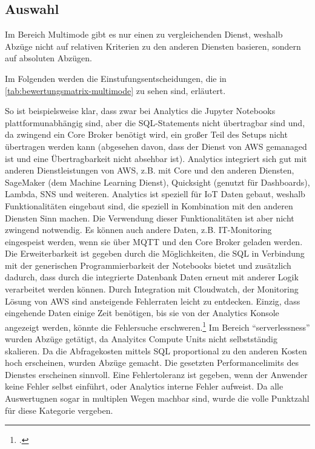 \subsection{Auswahl}
Im Bereich Multimode gibt es nur einen zu vergleichenden Dienst, weshalb Abzüge nicht auf relativen Kriterien zu den anderen Diensten basieren, sondern auf absoluten Abzügen.

Im Folgenden werden die Einstufungsentscheidungen, die in \autoref{tab:bewertungsmatrix-multimode} zu sehen sind, erläutert.

So ist beispielsweise klar, dass zwar bei \AWSIOT{} Analytics die Jupyter Notebooks plattformunabhängig sind, aber die \ac{SQL}-Statements nicht übertragbar sind und, da zwingend ein \AWSIOT{} Core Broker benötigt wird, ein großer Teil des Setups nicht übertragen werden kann (abgesehen davon, dass der Dienst von \ac{AWS} gemanaged ist und eine Übertragbarkeit nicht absehbar ist).
\AWSIOT{} Analytics integriert sich gut mit anderen Dienstleistungen von AWS, z.B. mit \AWSIOT{} Core und den anderen \AWSIOT{} Diensten, SageMaker (dem Machine Learning Dienst), Quicksight (genutzt für Dashboards), Lambda, \ac{SNS} und weiteren.
\AWSIOT{} Analytics ist speziell für \ac{IoT} Daten gebaut, weshalb Funktionalitäten eingebaut sind, die speziell in Kombination mit den anderen \AWSIOT{} Diensten Sinn machen. Die Verwendung dieser Funktionalitäten ist aber nicht zwingend notwendig. Es können auch andere Daten, z.B. IT-Monitoring eingespeist werden, wenn sie über \ac{MQTT} und den \AWSIOT{} Core Broker geladen werden.
Die Erweiterbarkeit ist gegeben durch die Möglichkeiten, die \ac{SQL} in Verbindung mit der generischen Programmierbarkeit der Notebooks bietet und zusätzlich dadurch, dass durch die integrierte Datenbank Daten erneut mit anderer Logik verarbeitet werden können.
Durch Integration mit Cloudwatch, der Monitoring Lösung von \ac{AWS} sind ansteigende Fehlerraten leicht zu entdecken. Einzig, dass eingehende Daten einige Zeit benötigen, bis sie von der \AWSIOT{} Analytics Konsole angezeigt werden, könnte die Fehlersuche erschweren.\footcite[Vgl.][]{AmazonWebServicesInc..o.J.aw}
Im Bereich \enquote{serverlessness} wurden Abzüge getätigt, da Analyitcs Compute Units nicht selbstständig skalieren.
Da die Abfragekosten mittels \ac{SQL} proportional zu den anderen Kosten hoch erscheinen, wurden Abzüge gemacht.
Die gesetzten Performancelimits des Dienstes erscheinen sinnvoll. Eine Fehlertoleranz ist gegeben, wenn der Anwender keine Fehler selbst einführt, oder \AWSIOT{} Analytics interne Fehler aufweist. Da alle Auswertugnen sogar in multiplen Wegen machbar sind, wurde die volle Punktzahl für diese Kategorie vergeben.


